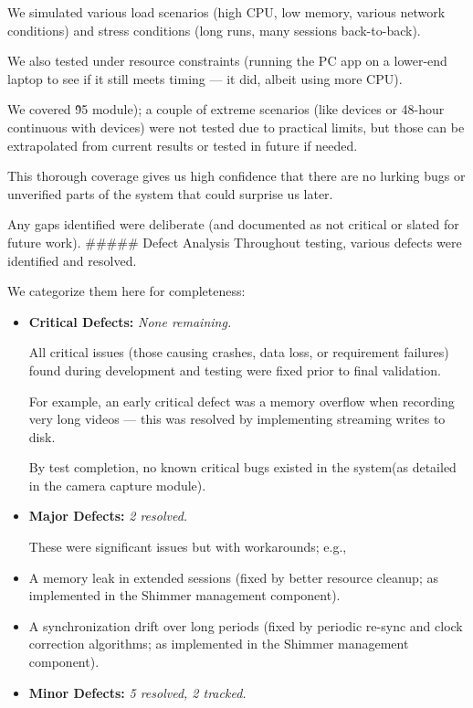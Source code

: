 {{{{{{{{{{{{{{We simulated various load scenarios (high CPU, low memory, various network
conditions) and stress conditions (long runs, many sessions back-to-back).

We also tested under resource constraints (running the PC app on a lower-end
laptop to see if it still meets timing --- it did, albeit using more CPU).

We covered \~95%
module); a couple of extreme scenarios (like  devices or 48-hour continuous
with  devices) were not tested due to practical limits, but those can be
extrapolated from current results or tested in future if needed.

This thorough coverage gives us high confidence that there are no lurking bugs
or unverified parts of the system that could surprise us later.

Any gaps identified were deliberate (and documented as not critical or slated
for future work). ##### Defect Analysis Throughout testing, various defects were
identified and resolved.

We categorize them here for completeness: \begin{itemize}

\item \textbf{Critical Defects:}
 \textit{None remaining.}

All critical issues (those causing crashes, data loss, or requirement failures)
found during development and testing were fixed prior to final validation.

For example, an early critical defect was a memory overflow when recording very
long videos --- this was resolved by implementing streaming writes to disk.

By test completion, no known critical bugs existed in the system(as detailed in
the camera capture module).

\item \textbf{Major Defects:}
 \textit{2 resolved.}

These were significant issues but with workarounds; e.g.,
\item A memory leak in extended sessions (fixed by better resource cleanup; as
implemented in the Shimmer management component).

\item A synchronization drift over long periods (fixed by periodic re-sync and
clock correction algorithms; as implemented in the Shimmer management
component).

\item \textbf{Minor Defects:}
 \textit{5 resolved, 2 tracked.}


\end{itemize}}}}}}}}}}}}}}}

